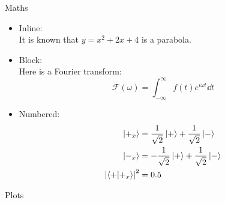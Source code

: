 \documentclass[10pt]{beamer}
\begin{document}
\begin{frame}
    
\end{frame}
\begin{frame}{Maths}
\begin{itemize}
    \item Inline:\\
    It is known that $y=x^2+2x+4$ is a parabola.\par
    \item Block:\\
    Here is a Fourier transform:
    \[\mathcal{F}\left(\omega\right)=\int_{-\infty}^\infty f(t) e^{i\omega t}\dd t\]
    \item Numbered:
    \begin{subequations}
    \begin{align}
        \ket{+_x} &= \frac{1}{\sqrt{2}} \ket{+} + \frac{1}{\sqrt{2}} \ket{-}\\
        \ket{-_x} &= -\frac{1}{\sqrt{2}} \ket{+} + \frac{1}{\sqrt{2}} \ket{-}\\
        \abs{\braket{+}{+_x}}^2 &= 0.5
    \end{align}
    \end{subequations}
\end{itemize}


\end{frame}
\begin{frame}{Plots}
    
\end{frame}
\end{document}
